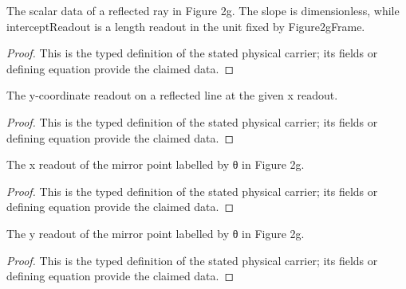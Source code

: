 \begin{definition}
  \label{def:physics:IPhO_2026_2_C_4:aux002}
  The scalar data of a reflected ray in Figure 2g. The slope is dimensionless, while interceptReadout is a length readout in the unit fixed by Figure2gFrame.
\end{definition}
\begin{proof}
  This is the typed definition of the stated physical carrier; its fields or defining equation provide the claimed data.
\end{proof}

\begin{definition}
  \label{def:physics:IPhO_2026_2_C_4:aux003}
  The y-coordinate readout on a reflected line at the given x readout.
\end{definition}
\begin{proof}
  This is the typed definition of the stated physical carrier; its fields or defining equation provide the claimed data.
\end{proof}

\begin{definition}
  \label{def:physics:IPhO_2026_2_C_4:aux004}
  The x readout of the mirror point labelled by θ in Figure 2g.
\end{definition}
\begin{proof}
  This is the typed definition of the stated physical carrier; its fields or defining equation provide the claimed data.
\end{proof}

\begin{definition}
  \label{def:physics:IPhO_2026_2_C_4:aux005}
  The y readout of the mirror point labelled by θ in Figure 2g.
\end{definition}
\begin{proof}
  This is the typed definition of the stated physical carrier; its fields or defining equation provide the claimed data.
\end{proof}

